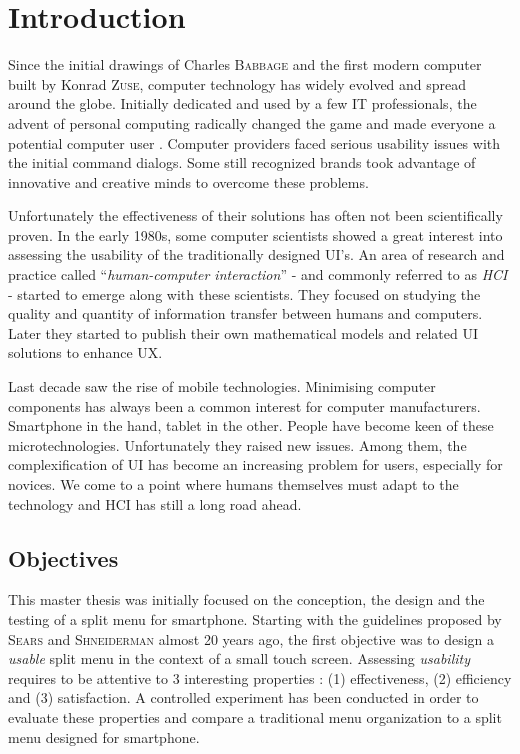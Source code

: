 \chapter{Introduction}
Since the initial drawings of Charles \textsc{Babbage} and the first modern 
computer 
built by Konrad \textsc{Zuse}, computer technology has widely evolved and 
spread around 
the globe. Initially dedicated and used by a few IT professionals, 
the advent of personal computing radically changed the game and made everyone a 
potential computer user \cite{hci}. Computer providers faced serious usability 
issues with the initial command dialogs. Some still recognized brands took 
advantage of innovative and creative minds to overcome these problems.\newline

Unfortunately the effectiveness of their solutions has often not been 
scientifically proven. In the early 1980s, some computer scientists showed a 
great 
interest into assessing the usability of the traditionally designed UI's. An 
area of research and practice called \enquote{\textit{human-computer 
interaction}} - and 
commonly referred to as \textit{HCI} - started to emerge along with these 
scientists. They focused on studying the quality and quantity of information 
transfer between humans and computers. Later they started to publish their own 
mathematical models and related UI solutions to enhance UX.\newline

Last decade saw the rise of mobile technologies. Minimising computer components 
has always been a common interest for computer manufacturers. Smartphone in the 
hand, tablet in the other. People have become keen of these microtechnologies. 
Unfortunately they raised new issues. Among them, the complexification of UI has 
become an increasing problem for users, especially for novices. We come to a 
point where humans themselves must adapt to the technology and HCI has still a 
long road ahead.

\section{Objectives}
This master thesis was initially focused on the conception, the design and the 
testing of a split menu for smartphone. Starting with the guidelines proposed 
by \textsc{Sears} and \textsc{Shneiderman} \cite{sears} almost 20 years ago, the 
first objective 
was to design a \textit{usable} split menu in the context of a small 
touch screen. Assessing \textit{usability} requires to be attentive to 3 
interesting properties : (1) effectiveness, (2) efficiency and (3) 
satisfaction. A controlled experiment has been conducted in order to 
evaluate these properties and compare a traditional menu organization to a 
split menu designed for smartphone. \newline

